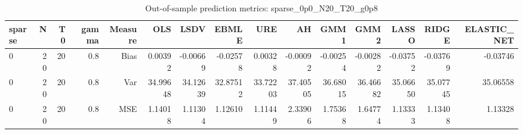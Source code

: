 \begin{table}[!htbp]\centering
\caption{Out-of-sample prediction metrics: sparse_0p0_N20_T20_g0p8}
\label{tab:table3_sparse_0p0_N20_T20_g0p8}
\begin{tabular}{lrrrrrrrrrrrrrr}
\hline
sparse & N & T0 & gamma & Measure & OLS & LSDV & EBMLE & URE & AH & GMM1 & GMM2 & LASSO & RIDGE & ELASTIC_NET \\
\hline
0 & 20 & 20 & 0.8 & Bias & 0.00392 & -0.00669 & -0.02578 & 0.00328 & -0.00092 & -0.00254 & -0.00282 & -0.03752 & -0.03769 & -0.03746 \\
0 & 20 & 20 & 0.8 & Var & 34.99648 & 34.12639 & 32.87512 & 33.72203 & 37.40505 & 36.68015 & 36.46682 & 35.06650 & 35.07745 & 35.06558 \\
0 & 20 & 20 & 0.8 & MSE & 1.14018 & 1.11304 & 1.12610 & 1.11449 & 2.33906 & 1.75368 & 1.64774 & 1.13333 & 1.13408 & 1.13328 \\
\hline
\end{tabular}
\end{table}

